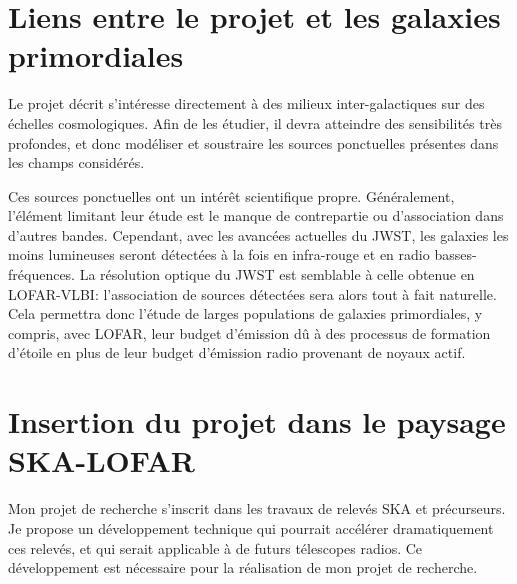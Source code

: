 \newpage

\section{Liens entre le projet et les galaxies primordiales}

\pg
Le projet d\'ecrit s'int\'eresse directement \`a des milieux inter-galactiques sur des \'echelles cosmologiques. Afin de les \'etudier, il devra atteindre des sensibilit\'es tr\`es profondes, et donc mod\'eliser et soustraire les sources ponctuelles pr\'esentes dans les champs consid\'er\'es.

\pg
Ces sources ponctuelles ont un int\'er\^et scientifique propre. G\'en\'eralement, l'\'el\'ement limitant leur \'etude est le manque de contrepartie ou d'association dans d'autres bandes. Cependant, avec les avanc\'ees actuelles du JWST, les galaxies les moins lumineuses seront d\'etect\'ees \`a la fois en infra-rouge et en radio basses-fr\'equences. La r\'esolution optique du JWST est semblable \`a celle obtenue en LOFAR-VLBI: l'association de sources d\'etect\'ees sera alors tout \`a fait naturelle. Cela permettra donc l'\'etude de larges populations de galaxies primordiales, y compris, avec LOFAR, leur budget d'\'emission d\^u \`a des processus de formation d'\'etoile en plus de leur budget d'\'emission radio provenant de noyaux actif.



\section{Insertion du projet dans le paysage SKA-LOFAR}

\pg
Mon projet de recherche s'inscrit dans les travaux de relev\'es SKA et pr\'ecurseurs. Je propose un d\'eveloppement technique qui pourrait acc\'el\'erer dramatiquement ces relev\'es, et qui serait applicable \`a de futurs t\'elescopes radios. Ce d\'eveloppement est n\'ecessaire pour la r\'ealisation de mon projet de recherche.

